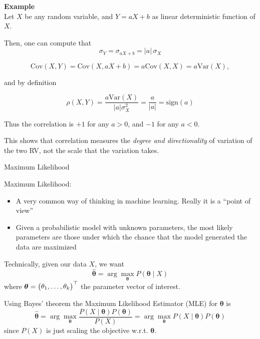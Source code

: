 {    \begin{frame}{}
        \vspace*{2mm}
        \textbf{Example}\\[3mm]

        Let $X$ be any random variable, and $Y=aX+b$ as linear deterministic function of $X$.

        Then, one can compute that
        $$\sigma_{Y} = \sigma_{aX+b} = |a|\,\sigma_{X}$$

        $$\mathrm{Cov}(X, Y) = \mathrm{Cov}(X, aX+b) = a\mathrm{Cov}(X, X) = a\mathrm{Var}(X),$$

        and by definition

        $$\rho(X, Y) = \frac{a\mathrm{Var}(X)}{|a|\sigma_{X}^2} = \frac{a}{|a|} = \mathrm{sign}(a)$$

        Thus the correlation is $+1$ for any $a > 0$, and $-1$ for any $a < 0$.

        This shows that correlation
        measures the \emph{degree and directionality} of variation of the two RV, not the scale
        that the variation takes.
    \end{frame}


    \begin{frame}{Maximum Likelihood}

        Maximum Likelihood:
        \begin{itemize}
            \item A very common way of thinking in machine learning. Really it is a ``point of view''
            \item Given a probabilistic model with unknown parameters,
                  the most likely parameters are those under which the chance
                  that the model generated the data are maximized
        \end{itemize}

        Technically, given our data $X$, we want
        $$\hat{\boldsymbol{\theta}} = \arg \max_{\boldsymbol{\theta}} P(\boldsymbol{\theta}\mid X)$$
        where $\boldsymbol{\theta} = \mqty(\theta_1, \ldots, \theta_k)^\top$ the parameter vector
        of interest.

        Using Bayes' theorem the Maximum Likelihood Estimator (MLE) for $\boldsymbol{\theta}$ is
        $$\hat{\boldsymbol{\theta}}
            = \arg \max_{\boldsymbol{\theta}} \frac{P(X \mid \boldsymbol{\theta})P(\boldsymbol{\theta})}{P(X)}
            = \arg \max_{\boldsymbol{\theta}} P(X \mid \boldsymbol{\theta})P(\boldsymbol{\theta})$$
        since $P(X)$ is just scaling the objective w.r.t. $\boldsymbol{\theta}$.


\end{frame}}
